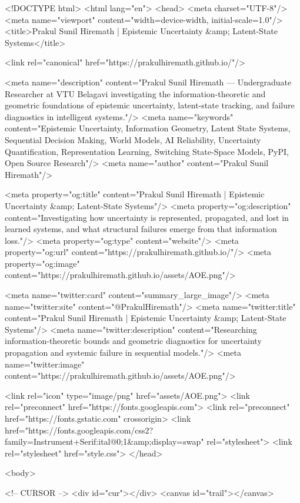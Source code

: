 <!DOCTYPE html>
<html lang="en">
<head>
  <meta charset="UTF-8"/>
  <meta name="viewport" content="width=device-width, initial-scale=1.0"/>
  <title>Prakul Sunil Hiremath | Epistemic Uncertainty &amp; Latent-State Systems</title>

  <link rel="canonical" href="https://prakulhiremath.github.io/"/>

  <meta name="description" content="Prakul Sunil Hiremath — Undergraduate Researcher at VTU Belagavi investigating the information-theoretic and geometric foundations of epistemic uncertainty, latent-state tracking, and failure diagnostics in intelligent systems."/>
  <meta name="keywords" content="Epistemic Uncertainty, Information Geometry, Latent State Systems, Sequential Decision Making, World Models, AI Reliability, Uncertainty Quantification, Representation Learning, Switching State-Space Models, PyPI, Open Source Research"/>
  <meta name="author" content="Prakul Sunil Hiremath"/>

  <meta property="og:title" content="Prakul Sunil Hiremath | Epistemic Uncertainty &amp; Latent-State Systems"/>
  <meta property="og:description" content="Investigating how uncertainty is represented, propagated, and lost in learned systems, and what structural failures emerge from that information loss."/>
  <meta property="og:type" content="website"/>
  <meta property="og:url" content="https://prakulhiremath.github.io/"/>
  <meta property="og:image" content="https://prakulhiremath.github.io/assets/AOE.png"/>

  <meta name="twitter:card" content="summary_large_image"/>
  <meta name="twitter:site" content="@PrakulHiremath"/>
  <meta name="twitter:title" content="Prakul Sunil Hiremath | Epistemic Uncertainty &amp; Latent-State Systems"/>
  <meta name="twitter:description" content="Researching information-theoretic bounds and geometric diagnostics for uncertainty propagation and systemic failure in sequential models."/>
  <meta name="twitter:image" content="https://prakulhiremath.github.io/assets/AOE.png"/>

  <link rel="icon" type="image/png" href="assets/AOE.png">
  <link rel="preconnect" href="https://fonts.googleapis.com">
  <link rel="preconnect" href="https://fonts.gstatic.com" crossorigin>
  <link href="https://fonts.googleapis.com/css2?family=Instrument+Serif:ital@0;1&amp;display=swap" rel="stylesheet">
  <link rel="stylesheet" href="style.css">
</head>
  
<body>

<!-- CURSOR -->
<div id="cur"></div>
<canvas id="trail"></canvas>

